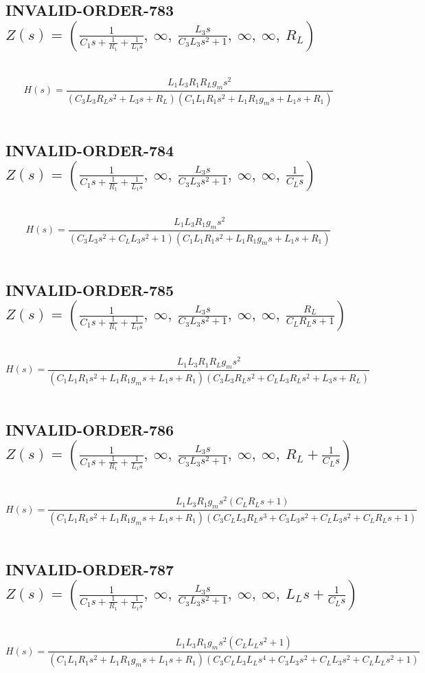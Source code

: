\documentclass{article}
\begin{document}
\subsection{INVALID-ORDER-783 $Z(s) = \left( \frac{1}{C_{1} s + \frac{1}{R_{1}} + \frac{1}{L_{1} s}}, \  \infty, \  \frac{L_{3} s}{C_{3} L_{3} s^{2} + 1}, \  \infty, \  \infty, \  R_{L}\right)$ } \ 
\textbf{\[H(s) = \frac{L_{1} L_{3} R_{1} R_{L} g_{m} s^{2}}{\left(C_{3} L_{3} R_{L} s^{2} + L_{3} s + R_{L}\right) \left(C_{1} L_{1} R_{1} s^{2} + L_{1} R_{1} g_{m} s + L_{1} s + R_{1}\right)}\] } \ 
\subsection{INVALID-ORDER-784 $Z(s) = \left( \frac{1}{C_{1} s + \frac{1}{R_{1}} + \frac{1}{L_{1} s}}, \  \infty, \  \frac{L_{3} s}{C_{3} L_{3} s^{2} + 1}, \  \infty, \  \infty, \  \frac{1}{C_{L} s}\right)$ } \ 
\textbf{\[H(s) = \frac{L_{1} L_{3} R_{1} g_{m} s^{2}}{\left(C_{3} L_{3} s^{2} + C_{L} L_{3} s^{2} + 1\right) \left(C_{1} L_{1} R_{1} s^{2} + L_{1} R_{1} g_{m} s + L_{1} s + R_{1}\right)}\] } \ 
\subsection{INVALID-ORDER-785 $Z(s) = \left( \frac{1}{C_{1} s + \frac{1}{R_{1}} + \frac{1}{L_{1} s}}, \  \infty, \  \frac{L_{3} s}{C_{3} L_{3} s^{2} + 1}, \  \infty, \  \infty, \  \frac{R_{L}}{C_{L} R_{L} s + 1}\right)$ } \ 
\textbf{\[H(s) = \frac{L_{1} L_{3} R_{1} R_{L} g_{m} s^{2}}{\left(C_{1} L_{1} R_{1} s^{2} + L_{1} R_{1} g_{m} s + L_{1} s + R_{1}\right) \left(C_{3} L_{3} R_{L} s^{2} + C_{L} L_{3} R_{L} s^{2} + L_{3} s + R_{L}\right)}\] } \ 
\subsection{INVALID-ORDER-786 $Z(s) = \left( \frac{1}{C_{1} s + \frac{1}{R_{1}} + \frac{1}{L_{1} s}}, \  \infty, \  \frac{L_{3} s}{C_{3} L_{3} s^{2} + 1}, \  \infty, \  \infty, \  R_{L} + \frac{1}{C_{L} s}\right)$ } \ 
\textbf{\[H(s) = \frac{L_{1} L_{3} R_{1} g_{m} s^{2} \left(C_{L} R_{L} s + 1\right)}{\left(C_{1} L_{1} R_{1} s^{2} + L_{1} R_{1} g_{m} s + L_{1} s + R_{1}\right) \left(C_{3} C_{L} L_{3} R_{L} s^{3} + C_{3} L_{3} s^{2} + C_{L} L_{3} s^{2} + C_{L} R_{L} s + 1\right)}\] } \ 
\subsection{INVALID-ORDER-787 $Z(s) = \left( \frac{1}{C_{1} s + \frac{1}{R_{1}} + \frac{1}{L_{1} s}}, \  \infty, \  \frac{L_{3} s}{C_{3} L_{3} s^{2} + 1}, \  \infty, \  \infty, \  L_{L} s + \frac{1}{C_{L} s}\right)$ } \ 
\textbf{\[H(s) = \frac{L_{1} L_{3} R_{1} g_{m} s^{2} \left(C_{L} L_{L} s^{2} + 1\right)}{\left(C_{1} L_{1} R_{1} s^{2} + L_{1} R_{1} g_{m} s + L_{1} s + R_{1}\right) \left(C_{3} C_{L} L_{3} L_{L} s^{4} + C_{3} L_{3} s^{2} + C_{L} L_{3} s^{2} + C_{L} L_{L} s^{2} + 1\right)}\] } \ 
\end{document}
